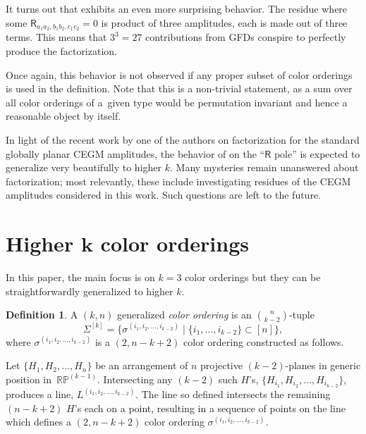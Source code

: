 \documentclass[pdftex]{sigma}
\theoremstyle{definition}
\newtheorem{defn}[thm]{Definition}
\newcommand{\sfR}{\mathsf{R}}
\def \min {{\rm minimal}}
\numberwithin{equation}{section}
\begin{document}
It turns out that \smash{$m_{6}^{(3)\, \min }$} exhibits an even more surprising behavior. The residue where some $\sfR_{a_1a_2,b_1b_2,c_1c_2}=0$ is product of three \smash{$m_{4}^{(2)\, \min }$} amplitudes, each is made out of three terms. This means that $3^3=27$ contributions from GFDs conspire to perfectly produce the factorization.

Once again, this behavior is not observed if any proper subset of color orderings is used in the definition. Note that this is a non-trivial statement, as a sum over all color orderings of a~given type would be permutation invariant and hence a reasonable object by itself.

In light of the recent work \cite{Early:2022mdn} by one of the authors on factorization for the standard globally planar CEGM amplitudes, the behavior of  on the ``$\sfR$ pole'' is expected to generalize very beautifully to higher $k$. Many mysteries remain unanswered about factorization; most relevantly, these include investigating residues of the CEGM amplitudes considered in this work. Such questions are left to the future.

\section[Higher k color orderings]{Higher $\boldsymbol{k}$ color orderings}\label{sechigherkGCO}

In this paper, the main focus is on $k=3$ color orderings
but they can be straightforwardly generalized to higher $k$.

\begin{defn}\label{GCOkkkk}
A $(k,n)$ generalized {\it color ordering} is an ${n\choose k-2}$-tuple
\[
\Sigma^{[k]} = \big\{ \sigma^{(i_1,i_2,\dots,i_{k-2})}\mid \{i_1,\dots, i_{k-2}\} \subset [n] \big\},
\]
where $\sigma^{(i_1,i_2,\dots,i_{k-2})}$ is a $(2,n-k+2)$ color ordering constructed as follows.

Let
$\{ H_{1},H_{2},\dots ,H_{n} \}$
be an arrangement of $n$ projective $({k-}2)$-planes in generic position in~$\mathbb{RP}^{(k-1)}$. Intersecting any $(k-2)$ such $H$'s, $\{ H_{i_1},H_{i_2},\dots,H_{i_{k-2}}\! \}$, produces a line, $L^{(i_1,i_2,\dots,i_{k-2})}$. The line so defined intersects the remaining $(n{-}k{+}2)$ $H$'s each on a point, resulting in a sequence of points on the line which defines a $(2,n{-}k{+}2)$
color ordering $\sigma^{(i_1,i_2,\dots, i_{k-2})}$.
\end{defn}
%
\end{document}
